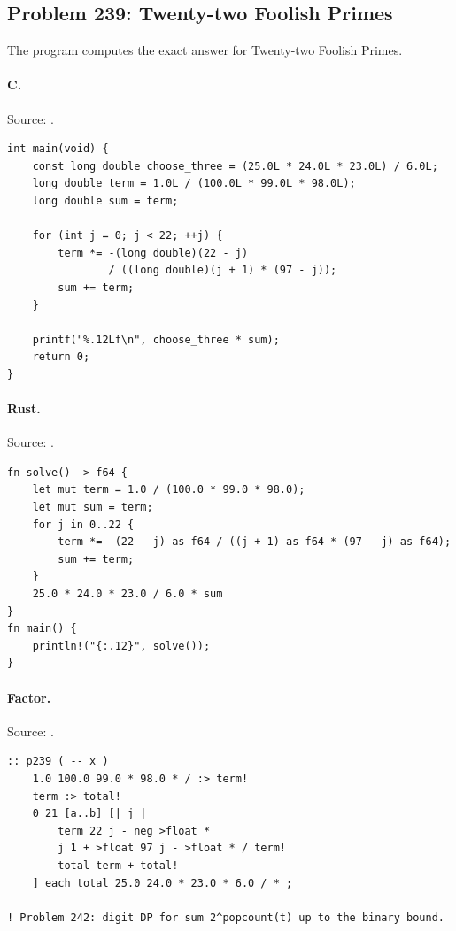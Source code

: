 \subsection{Problem 239: Twenty-two Foolish Primes}
\label{walkthrough:p239}
The program computes the exact answer for Twenty-two Foolish Primes.

\paragraph{C.} Source: .
\begin{lstlisting}
int main(void) {
    const long double choose_three = (25.0L * 24.0L * 23.0L) / 6.0L;
    long double term = 1.0L / (100.0L * 99.0L * 98.0L);
    long double sum = term;

    for (int j = 0; j < 22; ++j) {
        term *= -(long double)(22 - j)
                / ((long double)(j + 1) * (97 - j));
        sum += term;
    }

    printf("%.12Lf\n", choose_three * sum);
    return 0;
}
\end{lstlisting}

\paragraph{Rust.} Source: .
\begin{lstlisting}
fn solve() -> f64 {
    let mut term = 1.0 / (100.0 * 99.0 * 98.0);
    let mut sum = term;
    for j in 0..22 {
        term *= -(22 - j) as f64 / ((j + 1) as f64 * (97 - j) as f64);
        sum += term;
    }
    25.0 * 24.0 * 23.0 / 6.0 * sum
}
fn main() {
    println!("{:.12}", solve());
}
\end{lstlisting}

\paragraph{Factor.} Source: .
\begin{lstlisting}
:: p239 ( -- x )
    1.0 100.0 99.0 * 98.0 * / :> term!
    term :> total!
    0 21 [a..b] [| j |
        term 22 j - neg >float *
        j 1 + >float 97 j - >float * / term!
        total term + total!
    ] each total 25.0 24.0 * 23.0 * 6.0 / * ;

! Problem 242: digit DP for sum 2^popcount(t) up to the binary bound.
\end{lstlisting}

